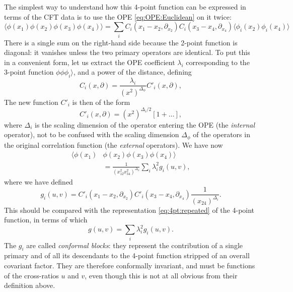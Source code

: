 \documentclass[a4paper,12pt]{article}
\numberwithin{equation}{section}
\begin{document}
The simplest way to understand how this 4-point function can be expressed in terms of the CFT data is to use the OPE \eqref{eq:OPE:Euclidean} on it twice:
\begin{equation}
	\langle \phi(x_1) \phi(x_2) \phi(x_3) \phi(x_4) \rangle
	= \sum_i C_i\left( x_1 - x_2, \partial_{x_2} \right)
	C_i\left( x_3 - x_4, \partial_{x_4} \right)
	\langle \phi_i(x_2) \phi_i(x_4) \rangle
\end{equation}
There is a single sum on the right-hand side because the 2-point function is diagonal: it vanishes unless the two primary operators are identical. To put this in a convenient form, let us extract the OPE coefficient $\lambda_i$ corresponding to the 3-point function $\phi\phi\phi_i\rangle$, and a power of the distance, defining
\begin{equation}
	C_i(x, \partial)
	= \frac{\lambda_i}{(x^2)^{\Delta_\phi}}
	C'_i(x, \partial),
\end{equation}
The new function $C'_i$ is then of the form
\begin{equation}
	C'_i(x, \partial) = (x^2)^{\Delta_i/2}
	\left[ 1 + \ldots \right],
\end{equation}
where $\Delta_i$ is the scaling dimension of the operator entering the OPE (the \emph{internal} operator), not to be confused with the scaling dimension $\Delta_\phi$ of the operators in the original correlation function (the \emph{external} operators).
We have now
\begin{equation}
\begin{aligned}
	\langle \phi(x_1) & \phi(x_2) \phi(x_3) \phi(x_4) \rangle
	\\
	&= \frac{1}{(x_{12}^2 x_{34}^2)^{\Delta_\phi}}
	\sum_i \lambda_i^2 g_i(u,v),
\end{aligned}
\end{equation}
where we have defined
\begin{equation}
	g_i(u,v) =
	C'_i\left( x_1 - x_2, \partial_{x_2} \right)
	C'_i\left( x_3 - x_4, \partial_{x_4} \right)
	\frac{1}{(x_{24})^{\Delta_i}}.
\end{equation}
This should be compared with the representation \eqref{eq:4pt:repeated} of the 4-point function, in terms of which
\begin{equation}
	g(u,v) = \sum_i \lambda_i^2 g_i(u,v).
\end{equation}
The $g_i$ are called \emph{conformal blocks}: they represent the contribution of a single primary and of all its descendants to the 4-point function stripped of an overall covariant factor. They are therefore conformally invariant, and must be functions of the cross-ratios $u$ and $v$, even though this is not at all obvious from their definition above. 
\end{document}
